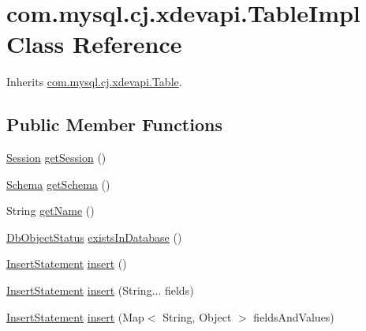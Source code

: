 \hypertarget{classcom_1_1mysql_1_1cj_1_1xdevapi_1_1_table_impl}{}\section{com.\+mysql.\+cj.\+xdevapi.\+Table\+Impl Class Reference}
\label{classcom_1_1mysql_1_1cj_1_1xdevapi_1_1_table_impl}


Inherits \mbox{\hyperlink{interfacecom_1_1mysql_1_1cj_1_1xdevapi_1_1_table}{com.\+mysql.\+cj.\+xdevapi.\+Table}}.

\subsection*{Public Member Functions}
\begin{DoxyCompactItemize}
\item 
\mbox{\hyperlink{interfacecom_1_1mysql_1_1cj_1_1xdevapi_1_1_session}{Session}} \mbox{\hyperlink{classcom_1_1mysql_1_1cj_1_1xdevapi_1_1_table_impl_a50a4a5d8827aef7156fe6aa564f8809a}{get\+Session}} ()
\item 
\mbox{\hyperlink{interfacecom_1_1mysql_1_1cj_1_1xdevapi_1_1_schema}{Schema}} \mbox{\hyperlink{classcom_1_1mysql_1_1cj_1_1xdevapi_1_1_table_impl_a8aac02838d6b25aeeaaa53c4a34f4bac}{get\+Schema}} ()
\item 
String \mbox{\hyperlink{classcom_1_1mysql_1_1cj_1_1xdevapi_1_1_table_impl_aeef36a88f386e5a6a7375315ab2af2c8}{get\+Name}} ()
\item 
\mbox{\hyperlink{enumcom_1_1mysql_1_1cj_1_1xdevapi_1_1_database_object_1_1_db_object_status}{Db\+Object\+Status}} \mbox{\hyperlink{classcom_1_1mysql_1_1cj_1_1xdevapi_1_1_table_impl_aa51ee706e090fe9acd2e81c313e5a6eb}{exists\+In\+Database}} ()
\item 
\mbox{\hyperlink{interfacecom_1_1mysql_1_1cj_1_1xdevapi_1_1_insert_statement}{Insert\+Statement}} \mbox{\hyperlink{classcom_1_1mysql_1_1cj_1_1xdevapi_1_1_table_impl_a1da24c004f76d313383111cb4f250a3c}{insert}} ()
\item 
\mbox{\hyperlink{interfacecom_1_1mysql_1_1cj_1_1xdevapi_1_1_insert_statement}{Insert\+Statement}} \mbox{\hyperlink{classcom_1_1mysql_1_1cj_1_1xdevapi_1_1_table_impl_a6ead605c582f7e5d5e95c0704a17686a}{insert}} (String... fields)
\item 
\mbox{\hyperlink{interfacecom_1_1mysql_1_1cj_1_1xdevapi_1_1_insert_statement}{Insert\+Statement}} \mbox{\hyperlink{classcom_1_1mysql_1_1cj_1_1xdevapi_1_1_table_impl_acc6cac6129c86ac4ec2a7ce02303b4bb}{insert}} (Map$<$ String, Object $>$ fields\+And\+Values)

\end{DoxyCompactItemize}
